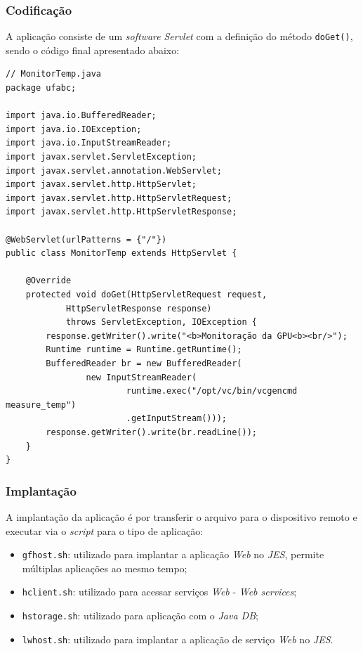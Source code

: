 \subsubsection{Codificação}

A aplicação consiste de um \textit{software} \textit{Servlet} com a definição
do método \verb|doGet()|, sendo o código final apresentado abaixo:

\begin{verbatim}
// MonitorTemp.java
package ufabc;

import java.io.BufferedReader;
import java.io.IOException;
import java.io.InputStreamReader;
import javax.servlet.ServletException;
import javax.servlet.annotation.WebServlet;
import javax.servlet.http.HttpServlet;
import javax.servlet.http.HttpServletRequest;
import javax.servlet.http.HttpServletResponse;

@WebServlet(urlPatterns = {"/"})
public class MonitorTemp extends HttpServlet {

    @Override
    protected void doGet(HttpServletRequest request,
            HttpServletResponse response)
            throws ServletException, IOException {
        response.getWriter().write("<b>Monitoração da GPU<b><br/>");
        Runtime runtime = Runtime.getRuntime();
        BufferedReader br = new BufferedReader(
                new InputStreamReader(
                        runtime.exec("/opt/vc/bin/vcgencmd measure_temp")
                        .getInputStream()));
        response.getWriter().write(br.readLine());
    }
}
\end{verbatim}

\subsubsection{Implantação}

A implantação da aplicação é por transferir o arquivo para o dispositivo remoto
e executar via o \textit{script} para o tipo de aplicação:

\begin{itemize}

    \item \verb|gfhost.sh|: utilizado para implantar a aplicação \textit{Web}
    no \textit{JES}, permite múltiplas aplicações ao mesmo tempo;

    \item \verb|hclient.sh|: utilizado para acessar serviços \textit{Web} -
    \textit{Web services};

    \item \verb|hstorage.sh|: utilizado para aplicação com o \textit{Java DB};

    \item \verb|lwhost.sh|: utilizado para implantar a aplicação de serviço
    \textit{Web} no \textit{JES}.

\end{itemize}

